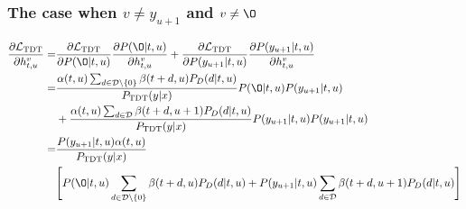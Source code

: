 \documentclass{article}
\begin{document}
\subsubsection{The case when $v\neq y_{u+1}$ and $v \neq \O$}
\begin{equation}
\begin{aligned}
 \frac{\partial{\mathcal{L}_\text{TDT}}}{\partial{h_{t, u}^{v}}} = & \frac{\partial{\mathcal{L}_\text{TDT}}}{\partial{P(\O| t, u)}} \frac{\partial{P(\O| t, u)}}{\partial{h_{t, u}^{v}}} + \frac{\partial{\mathcal{L}_\text{TDT}}}{\partial{P(y_{u+1}| t, u)}} \frac{\partial{P(y_{u+1}| t, u)}}{\partial{h_{t, u}^{v}}}  \\
 = & \frac{\alpha(t, u) \sum_{d \in \mathcal{D} \setminus \{0\}} {\beta(t + d,u) P_D(d|t, u)}} {P_\text{TDT}(y|x)} P(\O| t, u) P(y_{u+1}| t, u) \\
 & + \frac{\alpha(t, u) \sum_{d \in \mathcal{D}}                 {\beta(t + d,u+1)P_D(d|t,u)}} {P_\text{TDT}(y|x)} P(y_{u+1}| t, u) P(y_{u+1}|t, u) \\
 = & \frac{P(y_{u+1}|t, u) \alpha(t, u)}{P_\text{TDT}(y|x)}\\
 & \Biggl[ P(\O|t, u)  \sum_{d \in \mathcal{D} \setminus \{0\}} {\beta(t + d,u) P_D(d|t, u)} + P(y_{u+1}|t, u)  \sum_{d \in \mathcal{D}}                 {\beta(t + d,u+1)P_D(d|t,u)}  \Biggr]
 \end{aligned} 
\end{equation}
\end{document}
